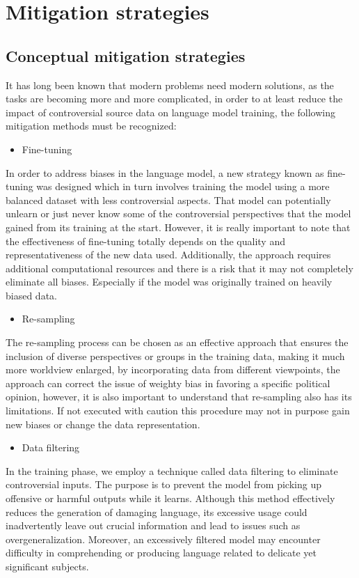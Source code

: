 \section{Mitigation strategies}
\subsection{Conceptual mitigation strategies}
It has long been known that modern problems need modern solutions, as the tasks are becoming more and more complicated, in order to at least reduce the impact of controversial source data on language model training, the following mitigation methods must be recognized: 
\begin{itemize}
    \item Fine-tuning
\end{itemize}
 In order to address biases in the language model, a new strategy known as fine-tuning was designed which in turn involves training the model using a more balanced dataset with less controversial aspects. That model can potentially unlearn or just never know some of the controversial perspectives that the model gained from its training at the start. However, it is really important to note that the effectiveness of fine-tuning totally depends on the quality and representativeness of the new data used. Additionally, the approach requires additional computational resources and there is a risk that it may not completely eliminate all biases. Especially if the model was originally trained on heavily biased data. 
\begin{itemize}
    \item Re-sampling
\end{itemize}
The re-sampling process can be chosen as an effective approach that ensures the inclusion of diverse perspectives or groups in the training data, making it much more worldview enlarged, by incorporating data from different viewpoints, the approach can correct the issue of weighty bias in favoring a specific political opinion, however, it is also important to understand that re-sampling also has its limitations. If not executed with caution this procedure may not in purpose gain new biases or change the data representation. \cite{kk2019}
\begin{itemize}
    \item Data filtering
\end{itemize}
In the training phase, we employ a technique called data filtering to eliminate controversial inputs. The purpose is to prevent the model from picking up offensive or harmful outputs while it learns. Although this method effectively reduces the generation of damaging language, its excessive usage could inadvertently leave out crucial information and lead to issues such as overgeneralization. Moreover, an excessively filtered model may encounter difficulty in comprehending or producing language related to delicate yet significant subjects. \cite{ld2018}

